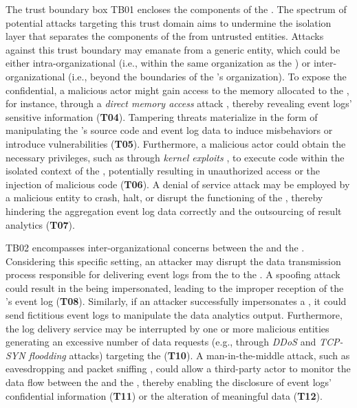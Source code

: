 \begin{newj}
The trust boundary box TB01 encloses the components of the . The spectrum of potential attacks targeting this trust domain aims to undermine the isolation layer that separates the components of the  from untrusted entities. Attacks against this trust boundary may emanate from a generic entity, which could be either intra-organizational (i.e., within the same organization as the ) or inter-organizational (i.e., beyond the boundaries of the 's organization). To expose the confidential, a malicious actor might gain access to the memory allocated to the , for instance, through a \textit{direct memory access} attack \cite{DBLP:conf/cms/EckertPK13}, thereby revealing event logs' sensitive information (\textbf{T04}). Tampering threats materialize in the form of manipulating the 's source code and event log data to induce misbehaviors or introduce vulnerabilities (\textbf{T05}). Furthermore, a malicious actor could obtain the necessary privileges, such as through \textit{kernel exploits} \cite{DBLP:conf/securecomm/XiaoHW15a}, to execute code within the isolated context of the , potentially resulting in unauthorized access or the injection of malicious code (\textbf{T06}). A denial of service attack may be employed by a malicious entity to crash, halt, or disrupt the functioning of the , thereby hindering the aggregation event log data correctly and the outsourcing of result analytics (\textbf{T07}). 

TB02  encompasses inter-organizational concerns between the  and the . Considering this specific setting, an attacker may disrupt the data transmission process responsible for delivering event logs from the  to the . A spoofing attack could result in the  being impersonated, leading to the improper reception of the 's event log (\textbf{T08}). Similarly, if an attacker successfully impersonates a , it could send fictitious event logs to manipulate the data analytics output. Furthermore, the log delivery service may be interrupted by one or more malicious entities generating an excessive number of data requests (e.g., through \textit{DDoS} \cite{DBLP:journals/ijdsn/MahjabinXSJ17} and \textit{TCP-SYN floodding} \cite{DBLP:journals/wpc/SwamiDR21} attacks) targeting the  (\textbf{T10}). A man-in-the-middle attack, such as eavesdropping and packet sniffing \cite{DBLP:journals/jocs/LiXDZCW15}, could allow a third-party actor to monitor the data flow between the  and the , thereby enabling the disclosure of event logs' confidential information (\textbf{T11}) or the alteration of meaningful data (\textbf{T12}).


\end{newj}
